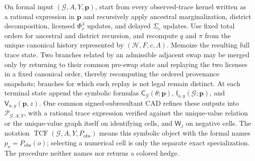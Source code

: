 On formal input \((\mathcal G,A,Y,\mathbf p)\), start from every observed-trace kernel written as a rational expression in \(\mathbf p\) and recursively apply ancestral marginalization, district decomposition, licensed \(\Phi_v^{\lambda}\) updates, and delayed \(\Sigma_c\) updates. Use fixed total orders for ancestral and district recursion, and recompute \(q\) and \(\pi\) from the unique canonical history represented by \((\mathcal H,F,c,\Lambda)\). Memoize the resulting full trace state. Two branches related by an admissible adjacent swap may be merged only by returning to their common pre-swap state and replaying the two licenses in a fixed canonical order, thereby recomputing the ordered provenance snapshots; branches for which such replay is not legal remain distinct. At each terminal state append the symbolic formulas \(\mathsf C_{\mathcal G}(\theta;\mathbf p)\), \(\mathsf I_{a,y}(\mathcal G;\mathbf p)\), and \(\mathsf V_{a,y}(\mathbf p,z)\). One common signed-subresultant CAD refines these outputs into \(\mathscr P_{\mathcal G,A,Y}\), with a rational trace expression verified against the unique-value relation or the unique-value graph itself on identifying cells, and \(\mathsf W_j\) on negative cells. The notation \(\operatorname{TCF}(\mathcal G,A,Y,P_{\mathrm{obs}})\) means this symbolic object with the formal names \(p_o=P_{\mathrm{obs}}(o)\); selecting a numerical cell is only the separate exact specialization. The procedure neither names nor returns a colored hedge.